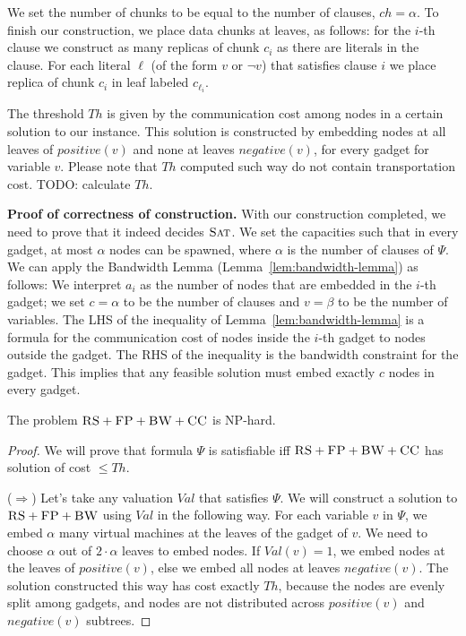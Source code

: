 \documentclass[9pt,twocolumn]{scrartcl}
\newcommand{\clauses}{\alpha}
\newcommand{\variables}{\beta}
\newcommand{\achunk}{c}
\newcommand{\CC}{\textsc{CC}}
\newcommand{\FP}{\textsc{FP}}
\newcommand{\RS}{\textsc{RS}}
\newcommand{\BW}{\textsc{BW}}
\newcommand{\SAT}{\textsc{Sat}}
\newcommand{\Formula}{\ensuremath{\Psi}}
\newcommand{\ChunkTypes}{\ensuremath{ch}}
\newcommand{\Thr}{\ensuremath{Th}}
\newcommand{\positive}{\ensuremath{positive}}
\newcommand{\negative}{\ensuremath{negative}}
\newcommand{\Val}{\ensuremath{Val}}
\begin{document}
\begin{appendix}
We set the number of chunks to be equal to the number of clauses, $\ChunkTypes =
\clauses$. To finish our construction, we place data chunks at
leaves, as follows: for the $i$-th clause we
construct as many replicas of chunk $\achunk_i$ as there are literals in the
clause. For each literal $\ell$ (of the form $v$ or $\neg v$) that satisfies clause $i$ we place
replica of chunk $\achunk_i$ in leaf labeled $\achunk_{\ell_i}$.

The threshold $\Thr$ is given by the
communication cost among nodes in
a certain solution to our instance. This solution is constructed by embedding
nodes at all leaves of $\positive(v)$ and none at leaves
$\negative(v)$, for every gadget for variable $v$. Please note that $\Thr$
computed such way do not contain transportation cost. TODO: calculate
$\Thr$.

\textbf{Proof of correctness of construction.}
With our construction completed, we need to prove that it indeed
decides $\SAT$. We set the capacities such that in every gadget,
at most $\clauses$ nodes can be spawned, where $\clauses$
is the number of clauses of $\Formula$.
We can apply the Bandwidth Lemma (Lemma~\ref{lem:bandwidth-lemma}) as follows:
We interpret $a_i$ as the
number of nodes that are embedded in the $i$-th gadget; we set $c=\clauses$
to be the number
of clauses and $v=\variables$ to be the number of variables.
The LHS of the inequality of Lemma~\ref{lem:bandwidth-lemma}
is a formula for the communication cost of nodes inside the $i$-th
gadget to nodes outside the gadget. The RHS of the inequality is the
bandwidth constraint for the gadget. This implies that
any feasible solution must embed exactly $c$ nodes in every gadget.


\begin{theorem}
The problem $\RS+\FP+\BW+\CC$ is NP-hard.
\end{theorem}
\begin{proof}
We will prove that formula $\Formula$ is satisfiable iff $\RS+\FP+\BW+\CC$ has
solution of cost $\leq \Thr$.

($\Rightarrow$) Let's take any valuation $\Val$ that satisfies $\Formula$.
We will construct a solution to $\RS+\FP+\BW$ using $\Val$ in the following way.
For each variable $v$ in $\Formula$, we embed $\clauses$ many virtual machines
at the  leaves of the gadget of $v$. We need to choose $\clauses$ out of
$2 \cdot \clauses$ leaves to embed nodes. If $\Val(v) = 1$, we embed
nodes at the leaves
of $\positive(v)$, else we embed all nodes at leaves $\negative(v)$.
The solution constructed this way has cost exactly
$\Thr$, because the nodes are evenly split among gadgets, and nodes are not
distributed across $\positive(v)$ and $\negative(v)$ subtrees.


\end{proof}
\end{appendix}
\end{document}
